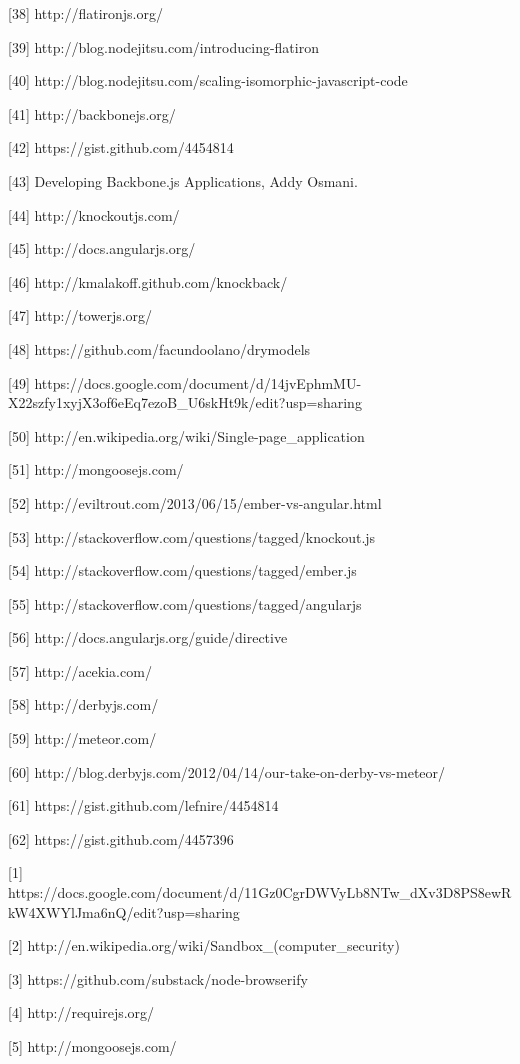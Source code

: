 \documentclass[doc,helv,longtable]{article}
\begin{document}
[38] http://flatironjs.org/

[39] http://blog.nodejitsu.com/introducing-flatiron

[40] http://blog.nodejitsu.com/scaling-isomorphic-javascript-code

[41] http://backbonejs.org/

[42] https://gist.github.com/4454814

[43] Developing Backbone.js Applications, Addy Osmani.

[44] http://knockoutjs.com/

[45] http://docs.angularjs.org/

[46] http://kmalakoff.github.com/knockback/

[47] http://towerjs.org/

[48] https://github.com/facundoolano/drymodels

[49] https://docs.google.com/document/d/14jvEphmMU-X22szfy1xyjX3of6eEq7ezoB_U6skHt9k/edit?usp=sharing

[50] http://en.wikipedia.org/wiki/Single-page_application

[51] http://mongoosejs.com/

[52] http://eviltrout.com/2013/06/15/ember-vs-angular.html

[53] http://stackoverflow.com/questions/tagged/knockout.js

[54] http://stackoverflow.com/questions/tagged/ember.js

[55] http://stackoverflow.com/questions/tagged/angularjs

[56] http://docs.angularjs.org/guide/directive

[57] http://acekia.com/

[58] http://derbyjs.com/

[59] http://meteor.com/

[60] http://blog.derbyjs.com/2012/04/14/our-take-on-derby-vs-meteor/

[61] https://gist.github.com/lefnire/4454814

[62] https://gist.github.com/4457396

[1] https://docs.google.com/document/d/11Gz0CgrDWVyLb8NTw_dXv3D8PS8ewRkW4XWYlJma6nQ/edit?usp=sharing

[2] http://en.wikipedia.org/wiki/Sandbox_(computer_security)

[3] https://github.com/substack/node-browserify

[4] http://requirejs.org/

[5] http://mongoosejs.com/
\end{document}
